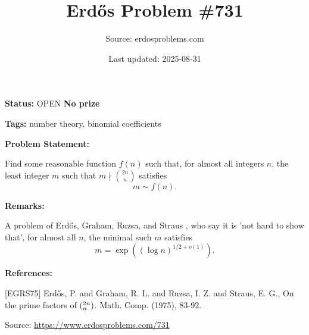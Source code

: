 \documentclass{article}
\title{Erd\H{o}s Problem \#731}
\date{Last updated: 2025-08-31}
\author{Source: erdosproblems.com}
\begin{document}
\maketitle

\noindent\textbf{Status:} OPEN \quad \textbf{No prize}

\noindent\textbf{Tags:} number theory, binomial coefficients

\medskip
\noindent\textbf{Problem Statement:}

Find some reasonable function $f(n)$ such that, for almost all integers $n$, the least integer $m$ such that $m\nmid \binom{2n}{n}$ satisfies\[m\sim f(n).\]

\bigskip
\noindent\textbf{Remarks:}

A problem of Erd\H{o}s, Graham, Ruzsa, and Straus \cite{EGRS75}, who say it is 'not hard to show that', for almost all $n$, the minimal such $m$ satisfies\[m=\exp((\log n)^{1/2+o(1)}).\]

\bigskip
\noindent\textbf{References:}

[EGRS75] Erd\H{o}s, P. and Graham, R. L. and Ruzsa, I. Z. and Straus, E. G., On the prime factors of $(\sp{2n}\sb{n})$. Math. Comp. (1975), 83-92.

\bigskip
\noindent\small{Source: \url{https://www.erdosproblems.com/731}}
\end{document}
